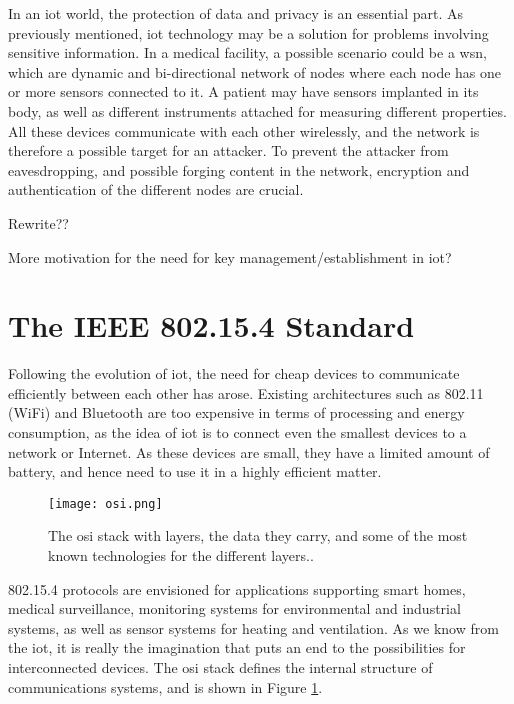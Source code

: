 In an \gls{iot} world, the protection of data and privacy is an essential part. As previously mentioned, \gls{iot} technology may be a solution for problems involving sensitive information. In a medical facility, a possible scenario could be a \gls{wsn}, which are dynamic and bi-directional network of nodes where each node has one or more sensors connected to it. A patient may have sensors implanted in its body, as well as different instruments attached for measuring different properties. All these devices communicate with each other wirelessly, and the network is therefore a possible target for an attacker. To prevent the attacker from eavesdropping, and possible forging content in the network, encryption and authentication of the different nodes are crucial.


Rewrite??

More motivation for the need for key management/establishment in \gls{iot}?



\section{The IEEE 802.15.4 Standard}

Following the evolution of \gls{iot}, the need for cheap devices to communicate efficiently between each other has arose. Existing architectures such as 802.11 (WiFi) and Bluetooth are too expensive in terms of processing and energy consumption, as the idea of \gls{iot} is to connect even the smallest devices to a network or Internet. As these devices are small, they have a limited amount of battery, and hence need to use it in a highly efficient matter.

\begin{figure}
	\centering
	\texttt{[image: osi.png]}
	\caption{The \gls{osi} stack with layers, the data they carry, and some of the most known technologies for the different layers..}
	\label{fig:osi}
\end{figure}

802.15.4 protocols are envisioned for applications supporting smart homes, medical surveillance, monitoring systems for environmental and industrial systems, as well as sensor systems for heating and ventilation. As we know from the \gls{iot}, it is really the imagination that puts an end to the possibilities for interconnected devices. The \gls{osi} stack defines the internal structure of communications systems, and is shown in Figure \ref{fig:osi}.

